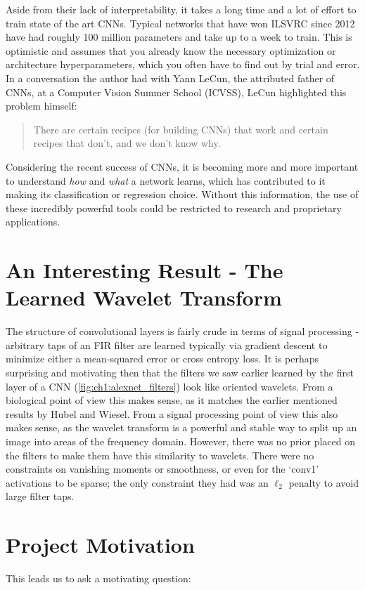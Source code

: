 Aside from their lack of interpretability, it takes a long time and a lot of
effort to train state of the art CNNs. Typical networks that have won ILSVRC
since 2012 have had roughly 100 million parameters and take up to a week to train. This 
is optimistic and assumes that you already know the necessary optimization or
architecture hyperparameters, which you often have to find out by trial and error. 
In a conversation the author had with Yann LeCun, the attributed father of
CNNs, at a Computer Vision Summer School (ICVSS), LeCun highlighted this problem
himself:
\begin{quote}
  There are certain recipes (for building CNNs) that work and certain recipes
  that don't, and we don't know why.
\end{quote}

Considering the recent success of CNNs, it is becoming more and more
important to understand \emph{how} and \emph{what} a network learns, which
has contributed to it making its classification or regression choice.
Without this information, the use of these incredibly powerful tools could be
restricted to research and proprietary applications.

\section{An Interesting Result - The Learned Wavelet Transform}
The structure of convolutional layers is fairly crude in terms of signal
processing - arbitrary taps of an FIR filter are learned typically via gradient
descent to minimize either a mean-squared error or cross entropy loss. It is perhaps surprising
and motivating then that the filters we saw earlier learned by the first layer of a CNN
(\autoref{fig:ch1:alexnet_filters}) look like oriented wavelets. 
From a biological point of view this makes sense, as it matches the earlier
mentioned results by Hubel and Wiesel. From a signal processing point of view
this also makes sense, as the wavelet transform is a powerful and stable way to
split up an image into areas of the frequency domain.  
However, there was no prior placed on the filters to make them have 
this similarity to wavelets. There were no constraints on vanishing
moments\cite{daubechies_ten_1992} or smoothness, or even for the `conv1' activations
to be sparse; the only constraint they had was an $\ell_2$ penalty to avoid large
filter taps.


\section{Project Motivation}
This leads us to ask a motivating question:

